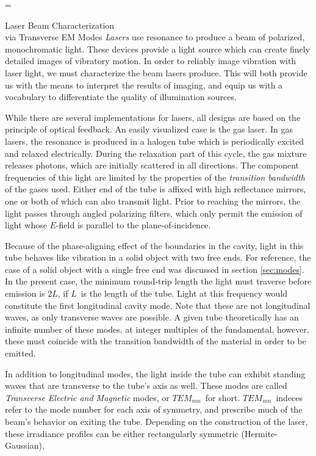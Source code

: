 \documentclass[a4paper,10pt]{report}
\makeatletter
\numberwithin{equation}{section}
\let\realnormalsize=\normalsize
\def\liih@math{\ifmmode$\else\bad@math\fi}
\def\adjustnormalsize{\def\normalsize{\mathsurround=0pt \realnormalsize
 \parindent=0pt\abovedisplayskip=0pt\belowdisplayskip=0pt}%
 \def\phantompar{\csname par\endcsname}\normalsize}%
\newcommand\lthtmlvboxmathA{\adjustnormalsize\setbox\sizebox=\vbox\bgroup %
 \let\ifinner=\iffalse \let\)\liih@math }%
\newcommand\lthtmlmathtype[1]{\gdef\lthtmlmathenv{#1}}%
\newcommand\lthtmlfigureA[1]{\let\@savefreelist\@freelist
       \lthtmlmathtype{#1}\lthtmlvboxmathA}%
\makeatother
\begin{document}
{\newpage\clearpage
\lthtmlfigureA{section1384}%
\begin{section}
{Laser Beam Characterization\\via Transverse EM Modes}
\emph{Lasers} use resonance to produce a beam of polarized, monochromatic light. These devices provide a light source which can create finely detailed images of vibratory motion. In order to reliably image vibration with laser light, we must characterize the beam lasers produce. This will both provide us with the means to interpret the results of imaging, and equip us with a vocabulary to differentiate the quality of illumination sources. 
\par
While there are several implementations for lasers, all designs are based on the principle of optical feedback. An easily visualized case is the gas laser. In gas lasers, the resonance is produced in a halogen tube which is periodically excited and relaxed electrically. During the relaxation part of this cycle, the gas mixture releases photons, which are initially scattered in all directions. The component frequencies of this light are limited by the properties of the \emph{transition bandwidth} of the gases used. Either end of the tube is affixed with high reflectance mirrors, one or both of which can also transmit light. Prior to reaching the mirrors, the light passes through angled polarizing filters, which only permit the emission of light whose $E$-field is parallel to the plane-of-incidence. \cite[p.564]{Hecht1987}
\par
Because of the phase-aligning effect of the boundaries in the cavity, light in this tube behaves like vibration in a solid object with two free ends. For reference, the case of a solid object with a single free end was discussed in section \ref{sec:modes}. In the present case, the minimum round-trip length the light must traverse before emission is $2L$, if $L$\  is the length of the tube. Light at this frequency would constitute the first longitudinal cavity mode. Note that these are not longitudinal waves, as only transverse waves are possible. A given tube theoretically has an infinite number of these modes, at integer multiples of the fundamental, however, these must coincide with the transition bandwidth of the material in order to be emitted.\cite[p.558]{Hecht1987}
\par
In addition to longitudinal modes, the light inside the tube can exhibit standing waves that are transverse to the tube's axis as well. These modes are called \emph{Transverse Electric and Magnetic} modes, or $TEM_{mn}$\  for short. $TEM_{mn}$\  indeces refer to the mode number for each axis of symmetry, and prescribe much of the beam's behavior on exiting the tube. Depending on the construction of the laser, these irradiance profiles can be either rectangularly symmetric (Hermite-Gaussian),

\end{section}}
\end{document}
